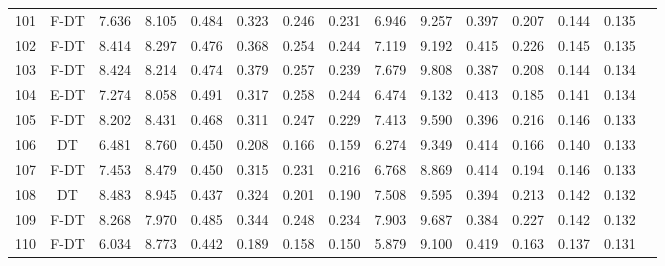 \begin{longtable}{@{\hskip3pt}c@{\hskip3pt}c@{\hskip3pt}c@{\hskip3pt}c@{\hskip3pt}c@{\hskip3pt}c@{\hskip3pt}c@{\hskip3pt}c@{\hskip3pt}c@{\hskip3pt}c@{\hskip3pt}c@{\hskip3pt}c@{\hskip3pt}c@{\hskip3pt}c@{\hskip3pt}c}
        101 &           F-DT &             7.636 &       8.105 &         0.484 &       0.323 &       0.246 &        0.231 &               6.946 &       9.257 &         0.397 &       0.207 &       0.144 &        0.135 \\
        102 &           F-DT &             8.414 &       8.297 &         0.476 &       0.368 &       0.254 &        0.244 &               7.119 &       9.192 &         0.415 &       0.226 &       0.145 &        0.135 \\
        103 &           F-DT &             8.424 &       8.214 &         0.474 &       0.379 &       0.257 &        0.239 &               7.679 &       9.808 &         0.387 &       0.208 &       0.144 &        0.134 \\
        104 &           E-DT &             7.274 &       8.058 &         0.491 &       0.317 &       0.258 &        0.244 &               6.474 &       9.132 &         0.413 &       0.185 &       0.141 &        0.134 \\
        105 &           F-DT &             8.202 &       8.431 &         0.468 &       0.311 &       0.247 &        0.229 &               7.413 &       9.590 &         0.396 &       0.216 &       0.146 &        0.133 \\
        106 &             DT &             6.481 &       8.760 &         0.450 &       0.208 &       0.166 &        0.159 &               6.274 &       9.349 &         0.414 &       0.166 &       0.140 &        0.133 \\
        107 &           F-DT &             7.453 &       8.479 &         0.450 &       0.315 &       0.231 &        0.216 &               6.768 &       8.869 &         0.414 &       0.194 &       0.146 &        0.133 \\
        108 &             DT &             8.483 &       8.945 &         0.437 &       0.324 &       0.201 &        0.190 &               7.508 &       9.595 &         0.394 &       0.213 &       0.142 &        0.132 \\
        109 &           F-DT &             8.268 &       7.970 &         0.485 &       0.344 &       0.248 &        0.234 &               7.903 &       9.687 &         0.384 &       0.227 &       0.142 &        0.132 \\
        110 &           F-DT &             6.034 &       8.773 &         0.442 &       0.189 &       0.158 &        0.150 &               5.879 &       9.100 &         0.419 &       0.163 &       0.137 &        0.131 \\

\end{longtable}
